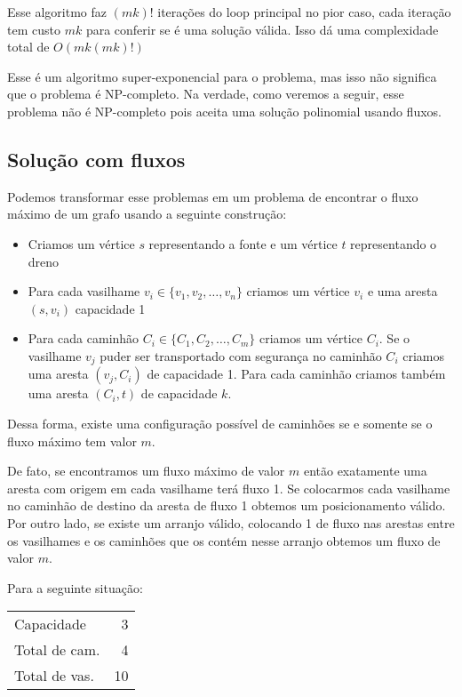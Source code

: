 \documentclass[11pt]{article}
\begin{document}
Esse algoritmo faz $(mk)!$ iterações do loop principal no pior caso, cada
iteração tem custo $mk$ para conferir se é uma solução válida. Isso dá
uma complexidade total de $O(mk(mk)!)$

Esse é um algoritmo super-exponencial para o problema, mas isso não
significa que o problema é NP-completo. Na verdade, como veremos a
seguir, esse problema não é NP-completo pois aceita uma solução
polinomial usando fluxos.

\subsection{Solução com fluxos}
\label{sec-2-1}

Podemos transformar esse problemas em um problema de encontrar o fluxo
máximo de um grafo usando a seguinte construção:

\begin{itemize}
\item Criamos um vértice $s$ representando a fonte e um vértice $t$
  representando o dreno

\item Para cada vasilhame $v_i \in \{v_1, v_2, \ldots, v_n\}$ criamos um
vértice $v_i$ e uma aresta $(s, v_i)$ capacidade 1

\item Para cada caminhão $C_i \in \{C_1, C_2, \ldots, C_m\}$ criamos um
vértice $C_i$. Se o vasilhame $v_j$ puder ser transportado com
segurança no caminhão $C_i$ criamos uma aresta $(v_j, C_i)$ de
capacidade 1. Para cada caminhão criamos também uma aresta $(C_i, t)$
de capacidade $k$.
\end{itemize}

Dessa forma, existe uma configuração possível de caminhões se e
somente se o fluxo máximo tem valor $m$.

De fato, se encontramos um fluxo máximo de valor $m$ então exatamente
uma aresta com origem em cada vasilhame terá fluxo 1. Se colocarmos
cada vasilhame no caminhão de destino da aresta de fluxo 1 obtemos um
posicionamento válido. Por outro lado, se existe um arranjo válido,
colocando 1 de fluxo nas arestas entre os vasilhames e os caminhões
que os contém nesse arranjo obtemos um fluxo de valor $m$.

Para a seguinte situação:
\begin{center}
\begin{tabular}{lr}
Capacidade & 3\\
Total de cam. & 4\\
Total de vas. & 10\\
\end{tabular}
\end{center}
\end{document}
